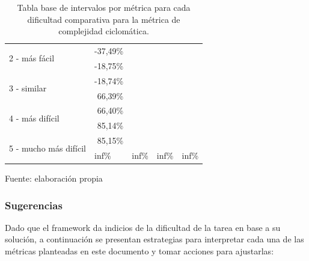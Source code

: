 \documentclass[letterpaper,12pt]{article}
\begin{document}
\begin{enumerate}
\begin{table}[H]
\begin{tabular}{|l|r|l|l|l|}
            \multirow{2}{*}{2 - más fácil}         & -37,49\%                                              &                        &                   &                  \\ \cline{2-5}
                                                   & -18,75\%                                              &                        &                   &                  \\ \hline
            \multirow{2}{*}{3 - similar}           & -18,74\%                                              &                        &                   &                  \\ \cline{2-5}
                                                   & 66,39\%                                               &                        &                   &                  \\ \hline
            \multirow{2}{*}{4 - más difícil}       & 66,40\%                                               &                        &                   &                  \\ \cline{2-5}
                                                   & 85,14\%                                               &                        &                   &                  \\ \hline
            \multirow{2}{*}{5 - mucho más difícil} & 85,15\%                                               &                        &                   &                  \\ \cline{2-5}
                                                   & \multicolumn{1}{l|}{inf\%}                            & inf\%                  & inf\%             & inf\%            \\ \hline
          \end{tabular}
          \caption{Tabla base de intervalos por métrica para cada dificultad comparativa para la métrica de complejidad ciclomática.} Fuente: elaboración propia
          \label{tab:base-int-table-4}
        \end{table}
\end{enumerate}

\subsubsection{Sugerencias}

Dado que el framework da indicios de la dificultad de la tarea en base a su solución, a continuación se presentan estrategias para interpretar cada una de las métricas planteadas en este documento y tomar acciones para ajustarlas:
\end{document}
